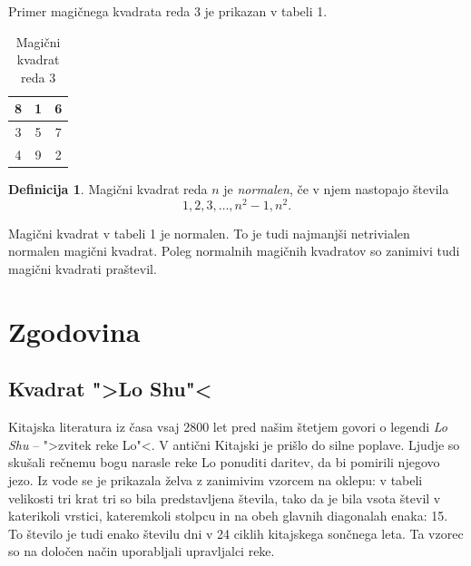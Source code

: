 \documentclass[a4paper,12pt]{article}
\theoremstyle{definition}
\newtheorem{definicija}{Definicija}
\theoremstyle{plain}
\begin{document}
Primer magičnega kvadrata reda 3 je prikazan v tabeli 1. %


\begin{table}[h]
   \centering
   \caption{Magični kvadrat reda 3}
   \label{table:mag3}
   
   \begin{tabular}{|c|c|c|}
   \hline 
    8 & 1 & 6 \\\hline 
    3 & 5 & 7 \\\hline 
    4 & 9 & 2 \\\hline 
   \end{tabular}
   
\end{table}

  
  \begin{definicija}
    Magični kvadrat reda \(n\) je \emph{normalen}, če v njem nastopajo števila
    \begin{equation}
       1, 2, 3, \ldots, n^2-1, n^2.
       \label{eq:numbers}
    \end{equation}
  \end{definicija}

Magični kvadrat v tabeli 1 je normalen.
To je tudi najmanjši netrivialen normalen magični kvadrat.
Poleg normalnih magičnih kvadratov so zanimivi tudi magični kvadrati praštevil. %


\section{Zgodovina}

\subsection{Kvadrat ">Lo Shu"<}

Kitajska literatura iz časa vsaj 2800 let pred našim štetjem govori o legendi
\emph{Lo Shu} -- ">zvitek reke Lo"<. V antični Kitajski je prišlo do
silne poplave. Ljudje so skušali rečnemu bogu narasle reke Lo ponuditi daritev,
da bi pomirili njegovo jezo. Iz vode se je prikazala želva z zanimivim vzorcem
na oklepu: v tabeli velikosti tri krat tri so bila predstavljena števila, tako
da je bila vsota števil v katerikoli vrstici, kateremkoli stolpcu in na obeh
glavnih diagonalah enaka: 15. To število je tudi enako številu dni v 24 ciklih
kitajskega sončnega leta. Ta vzorec so na določen način uporabljali upravljalci
reke.
\end{document}
